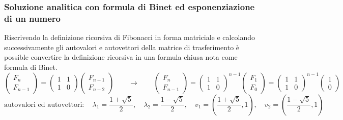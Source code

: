 \subsubsection*{Soluzione analitica con formula di Binet ed esponenziazione di un numero}
Riscrivendo la definizione ricorsiva di Fibonacci in forma matriciale e calcolando successivamente gli autovalori e autovettori
della matrice di trasferimento è possible convertire la definizione ricorsiva in una formula chiusa nota come formula di Binet.
\[\begin{pmatrix} F_n \\ F_{n-1} \end{pmatrix} = \begin{pmatrix} 1 & 1 \\ 1 & 0 \end{pmatrix} \begin{pmatrix} F_{n-1} \\ F_{n-2} \end{pmatrix} \qquad \rightarrow \qquad \begin{pmatrix} F_n \\ F_{n-1} \end{pmatrix} = \begin{pmatrix} 1 & 1 \\ 1 & 0 \end{pmatrix}^{n-1} \begin{pmatrix} F_{1} \\ F_{0} \end{pmatrix} = \begin{pmatrix} 1 & 1 \\ 1 & 0 \end{pmatrix}^{n-1} \begin{pmatrix} 1 \\ 0 \end{pmatrix}\]
\vspace{-7pt}
\[\text{autovalori ed autovettori} : \quad \lambda_1 = \frac{1 + \sqrt{5}}{2}, \quad \lambda_2 = \frac{1 - \sqrt{5}}{2}, \quad v_1 = \left(\frac{1 + \sqrt{5}}{2}, 1\right), \quad v_2 = \left(\frac{1 - \sqrt{5}}{2}, 1\right)\]
\vspace{-14pt}
